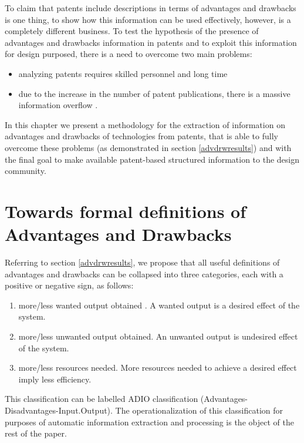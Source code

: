 \documentclass[]{book}
\providecommand{\tightlist}{%
  \setlength{\itemsep}{0pt}\setlength{\parskip}{0pt}}
\begin{document}
To claim that patents include descriptions in terms of advantages and
drawbacks is one thing, to show how this information can be used
effectively, however, is a completely different business. To test the
hypothesis of the presence of advantages and drawbacks information in
patents and to exploit this information for design purposed, there is a
need to overcome two main problems:

\begin{itemize}
\tightlist
\item
  analyzing patents requires skilled personnel and long time
  \citep{leon2007trends}
\item
  due to the increase in the number of patent publications, there is a
  massive information overflow \citep{bergmann2008evaluating}.
\end{itemize}

In this chapter we present a methodology for the extraction of
information on advantages and drawbacks of technologies from patents,
that is able to fully overcome these problems (as demonstrated in
section \ref{advdrwresults}) and with the final goal to make available
patent-based structured information to the design community.

\section{Towards formal definitions of Advantages and
Drawbacks}\label{towards-formal-definitions-of-advantages-and-drawbacks}

Referring to section \ref{advdrwresults}, we propose that all useful
definitions of advantages and drawbacks can be collapsed into three
categories, each with a positive or negative sign, as follows:

\begin{enumerate}
\def\labelenumi{\arabic{enumi}.}
\tightlist
\item
  more/less wanted output obtained . A wanted output is a desired effect
  of the system.
\item
  more/less unwanted output obtained. An unwanted output is undesired
  effect of the system.
\item
  more/less resources needed. More resources needed to achieve a desired
  effect imply less efficiency.
\end{enumerate}

This classification can be labelled ADIO classification
(Advantages-Disadvantages-Input.Output). The operationalization of this
classification for purposes of automatic information extraction and
processing is the object of the rest of the paper.
\end{document}
